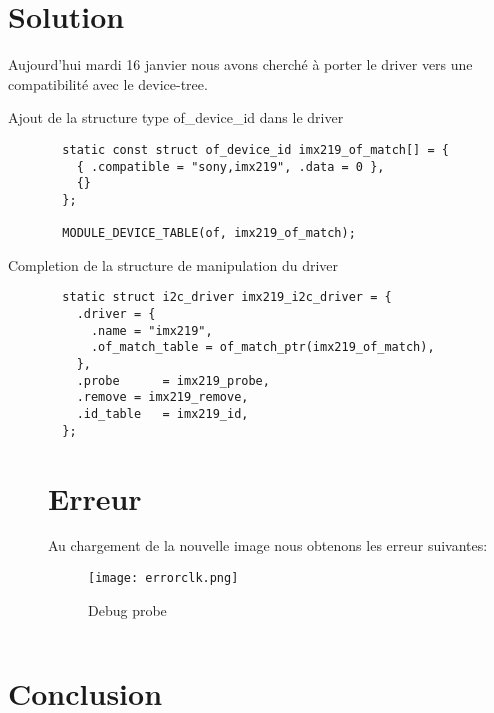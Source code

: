 \section{Solution}
Aujourd'hui mardi 16 janvier nous avons cherché à porter le driver vers
une compatibilité avec le device-tree.
\begin{description}
  \item[Ajout de la structure type of\_device\_id dans le driver]
  \begin{lstlisting}
  static const struct of_device_id imx219_of_match[] = {
    { .compatible = "sony,imx219", .data = 0 },
    {}
  };
   
  MODULE_DEVICE_TABLE(of, imx219_of_match);
  \end{lstlisting}

  \item[Completion de la structure de manipulation du driver]
  \begin{lstlisting}
  static struct i2c_driver imx219_i2c_driver = {
    .driver = {
      .name = "imx219",
      .of_match_table = of_match_ptr(imx219_of_match),
    },
    .probe		= imx219_probe,
    .remove	= imx219_remove,
    .id_table	= imx219_id,
  };
  \end{lstlisting}

\section{Erreur}
Au chargement de la nouvelle image nous obtenons les erreur suivantes:

\begin{figure}[th]
  \centering
  \texttt{[image: errorclk.png]}
  \decoRule
  \caption{Debug probe}  \label{fig:planning}
\end{figure}

    \end{description}

    \begin{lstlisting}

    \end{lstlisting}

    \clearpage

   

    \section{Conclusion}


